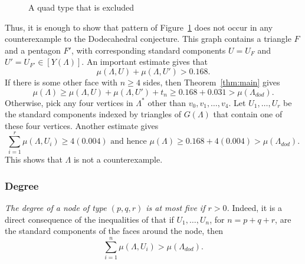 \documentclass{article} %
\begin{document}

\begin{figure}[htb]
  \begin{center}
  \end{center}
  \caption{A quad type that is excluded}
\label{fig:tripent}
\end{figure}

Thus, it is enough to show that pattern of Figure~\ref{fig:tripent} does not occur 
in any counterexample to the Dodecahedral conjecture.  This graph contains a triangle
$F$ and a pentagon $F'$, with corresponding standard components
$U=U_F$ and $U'=U_{F'}\in[Y(\Lambda)]$.
An important estimate \cite[Lemma~10.1]{Hales:2002:Dodec} gives that
$$
\mu(\Lambda,U) + \mu(\Lambda,U') > 0.168.
$$
If there is some other face  with $n\ge 4$ sides, then 
Theorem~\ref{thm:main} gives
$$
\mu(\Lambda) \ge \mu(\Lambda,U)+\mu(\Lambda,U') + t_n \ge 0.168 + 0.031 > \mu(\Lambda_{dod}).
$$
Otherwise, pick any four vertices in $\Lambda^*$ other than $v_0,v_1,\ldots,v_4$.  Let $U_1,\ldots,U_r$ be the standard components
indexed by triangles of $G(\Lambda)$
that contain one of these four vertices.  
Another estimate \cite[Lemma~5.2]{Hales:2002:Dodec} gives
$$
\sum_{i=1}^r \mu(\Lambda,U_i) \ge 4 (0.004) \text{ and hence }
\mu(\Lambda) \ge 0.168 + 4(0.004) > \mu(\Lambda_{dod}).
$$
This shows that $\Lambda$ is not a counterexample.


\subsubsection{Degree}

{\it The degree of a node of type $(p,q,r)$ is at most five if $r>0$.}
Indeed, it is a direct consequence of the inequalities of \cite{McLaughlin:2008:KeplerCode} that if $U_1,\ldots,U_n$, for $n=p+q+r$, are the standard components of the faces around the node, then 
  $$
  \sum_{i=1}^n \mu(\Lambda,U_i) > \mu(\Lambda_{dod}).
  $$


\end{document}
